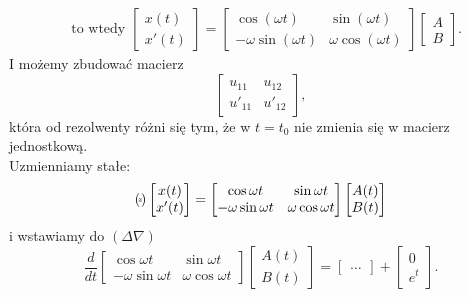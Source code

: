 \documentclass[../main.tex]{subfiles}
\begin{document}
\begin{przyklad}
\begin{align*}
                &\text{to wtedy } \begin{bmatrix} x(t)\\x'(t) \end{bmatrix} = \begin{bmatrix} \cos(\omega t) & \sin(\omega t)\\ -\omega \sin(\omega t) & \omega \cos(\omega t) \end{bmatrix} \begin{bmatrix} A\\B \end{bmatrix}
            .\end{align*}
            I możemy zbudować macierz
            \[
                \begin{bmatrix} u_{11}&u_{12}\\u'_{11}&u'_{12} \end{bmatrix}
            ,\]
            która od rezolwenty różni się tym, że w $t = t_0$ nie zmienia się w macierz jednostkową.\\
            Uzmienniamy stałe:
            \begin{align*}
                (_{\tilde \tilde} ) \begin{bmatrix} x(t)\\x'(t) \end{bmatrix} = \begin{bmatrix} \cos\omega t & \sin\omega t\\ -\omega \sin\omega t & \omega \cos \omega t \end{bmatrix} \begin{bmatrix} A(t) \\B(t)\end{bmatrix}
            \end{align*}
            i wstawiamy do $(\Delta\nabla)$
            \[
                \frac{d}{dt}\begin{bmatrix} \cos\omega t&\sin\omega t\\ -\omega \sin\omega t & \omega \cos\omega t \end{bmatrix} \begin{bmatrix} A(t)\\B(t) \end{bmatrix} = \begin{bmatrix} \ldots \end{bmatrix} + \begin{bmatrix} 0\\e^t \end{bmatrix}
            .\]
            \begin{align*}

\end{align*}
\end{przyklad}
\end{document}
